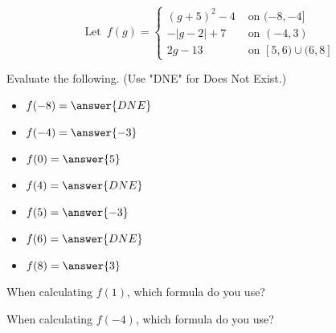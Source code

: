 \documentclass{ximera}
\author{Lee Wayand}
\begin{document}
\[
\text{ Let } \, f(g) = 
\begin{cases}
  (g+5)^2 - 4 & \text{ on } (-8,-4] \\
  -|g-2|+7 & \text{ on } (-4,3) \\
  2g-13 & \text{ on } [5,6) \cup (6,8]
\end{cases}
\]













\begin{exercise}

Evaluate the following. (Use "DNE" for Does Not Exist.)


\begin{itemize}
\item $f(-8) = \answer{DNE}$  
\item $f(-4) = \answer{-3}$ 
\item $f(0) = \answer{5}$ 
\item $f(4) = \answer{DNE}$ 
\item $f(5) = \answer{-3}$ 
\item $f(6) = \answer{DNE}$ 
\item $f(8) = \answer{3}$ 
\end{itemize}

\end{exercise}












\begin{exercise}

When calculating $f(1)$, which formula do you use?


\begin{multipleChoice}
\end{multipleChoice}

\end{exercise}









\begin{exercise}

When calculating $f(-4)$, which formula do you use?


\begin{multipleChoice}
\end{multipleChoice}

\end{exercise}
\end{document}
